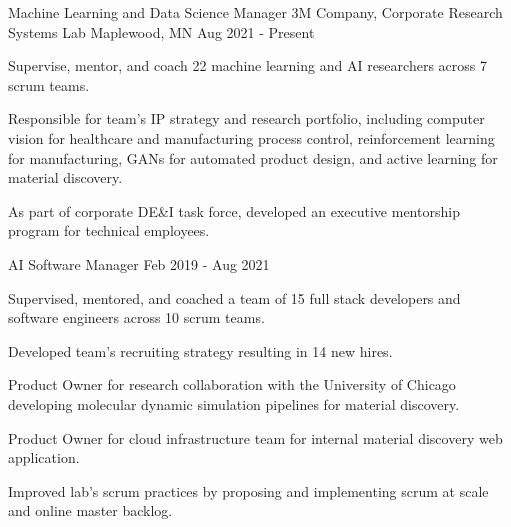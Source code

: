 

\begin{cventries}

  \cventry
    {Machine Learning and Data Science Manager} %
    {3M Company, Corporate Research Systems Lab} %
    {Maplewood, MN} %
    {Aug 2021 - Present} %
    {
      \begin{cvitems} %
      \item {Supervise, mentor, and coach 22 machine learning and AI researchers across 7 scrum
          teams.}
      \item{Responsible for team's IP strategy and research portfolio, including computer
          vision for healthcare and manufacturing process control, reinforcement learning
          for manufacturing, GANs for automated product design, and active learning for
          material discovery.}
      \item{As part of corporate DE\&I task force, developed an executive mentorship
          program for technical employees.}
      \end{cvitems}
    }

  \cventry
    {AI Software Manager} %
    {}
    {}
    {Feb 2019 - Aug 2021} %
    {
      \begin{cvitems} %
      \item {Supervised, mentored, and coached a team of 15 full stack developers and software engineers across 10 scrum
          teams.}
       \item {Developed team's recruiting strategy resulting in 14 new hires.}
       \item {Product Owner for research collaboration with the University of Chicago
           developing molecular dynamic simulation pipelines for material discovery.}
       \item {Product Owner for cloud infrastructure team for internal material discovery
           web application.}
       \item {Improved lab's scrum practices by proposing and implementing scrum at scale
           and online master backlog.}
      \end{cvitems}
    }


\end{cventries}
